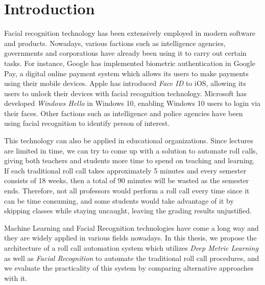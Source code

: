 \chapter{Introduction}
Facial recognition technology has been extensively employed in modern software and products. Nowadays, various factions
such as intelligence agencies, governments and corporations have already been using it to carry out certain tasks.
For instance, Google has implemented biometric authentication in Google Pay, a digital online payment system
which allows its users to make payments using their mobile devices. Apple has introduced \emph{Face ID} to iOS, allowing its users
to unlock their devices with facial recognition technology. Microsoft has developed \emph{Windows Hello} in Windows 10, enabling
Windows 10 users to login via their faces. Other factions such as intelligence and police agencies have been using facial recognition
to identify person of interest.

This technology can also be applied in educational organizations. Since lectures are limited in time, we can try to come up
with a solution to automate roll calls, giving both teachers and students more time to spend on teaching and learning.
If each traditional roll call takes approximately 5 minutes and every semester consists of 18 weeks, then a total of 90 minutes
will be wasted as the semester ends. Therefore, not all professors would perform a roll call every time since it can be time consuming,
and some students would take advantage of it by skipping classes while staying uncaught, leaving the grading results unjustified.

Machine Learning and Facial Recognition technologies have come a long way and they are widely applied in various fields nowadays.
In this thesis, we propose the architecture of a roll call automation system which utilizes \emph{Deep Metric Learning} as well as
\emph{Facial Recognition} to automate the traditional roll call procedures, and we evaluate the practicality of this system 
by comparing alternative approaches with it.





